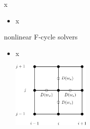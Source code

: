 \documentclass[10pt,
               svgnames,
               hyperref={colorlinks,citecolor=DeepPink4,linkcolor=FireBrick,urlcolor=Maroon},
               usepdftitle=false]{beamer}
\begin{document}
\begin{frame}{x}
\begin{itemize}
\item x
\end{itemize}
\end{frame}


\begin{frame}{nonlinear F-cycle solvers}
\begin{itemize}
\item x

\hfill \includegraphics[width=0.3\textwidth]{images/msboxstencil.png}
\end{itemize}
\end{frame}
\end{document}
